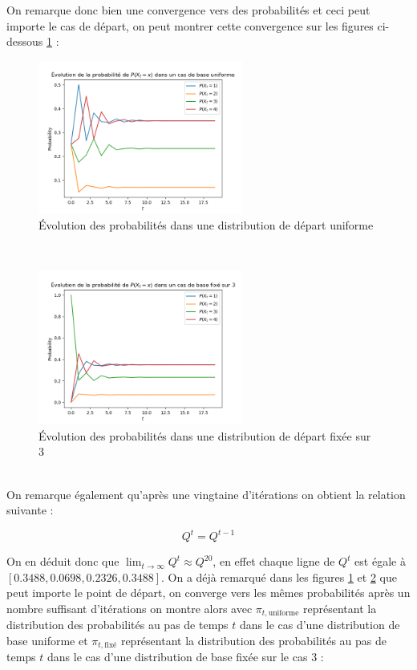 On remarque donc bien une convergence vers des probabilités et ceci peut importe le cas de départ, on peut montrer cette convergence sur les figures ci-dessous \ref{fig:unif} :
\begin{figure}[h!]
  \centering
  \includegraphics[width=0.6\textwidth]{figs/evo_unif.png}
  \caption{Évolution des probabilités dans une distribution de départ uniforme}
  \label{fig:unif}
\end{figure}
\\
\begin{figure}[h!]
  \centering
  \includegraphics[width=0.6\textwidth]{figs/evo_fixed.png}
  \caption{Évolution des probabilités dans une distribution de départ fixée sur 3}
  \label{fig:fixed}
\end{figure}
\\
On remarque également qu'après une vingtaine d'itérations on obtient la relation suivante :

\begin{equation*}
  Q^t = Q^{t-1}
\end{equation*}

On en déduit donc que $\lim_{t \rightarrow \infty} Q^t \approx Q^{20} $, en effet chaque ligne de $Q^t$ est égale à $[0.3488 , 0.0698 , 0.2326 , 0.3488]$. On a déjà remarqué dans les figures \ref{fig:unif} et \ref{fig:fixed} que peut importe le 
point de départ, on converge vers les mêmes probabilités après un nombre suffisant d'itérations on montre alors avec $\pi_{t,\text{uniforme}}$ représentant la distribution des probabilités au pas de temps $t$ dans le cas d'une 
distribution de base uniforme et $\pi_{t,\text{fixé}}$ représentant la distribution des probabilités au pas de temps $t$ dans le cas d'une 
distribution de base fixée sur le cas $3$ :  

